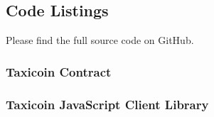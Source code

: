 \subsection*{Code Listings}

Please find the full source code on GitHub\cite{TaxicoinGitHub}.

\subsubsection*{Taxicoin Contract}



\subsubsection*{Taxicoin JavaScript Client Library}



